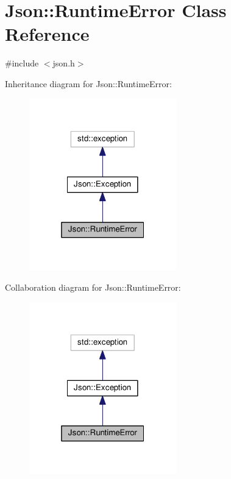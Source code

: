 \hypertarget{class_json_1_1_runtime_error}{}\section{Json\+:\+:Runtime\+Error Class Reference}
\label{class_json_1_1_runtime_error}


{\ttfamily \#include $<$json.\+h$>$}



Inheritance diagram for Json\+:\+:Runtime\+Error\+:
\nopagebreak
\begin{figure}[H]
\begin{center}
\leavevmode
\includegraphics[width=181pt]{class_json_1_1_runtime_error__inherit__graph}
\end{center}
\end{figure}


Collaboration diagram for Json\+:\+:Runtime\+Error\+:
\nopagebreak
\begin{figure}[H]
\begin{center}
\leavevmode
\includegraphics[width=181pt]{class_json_1_1_runtime_error__coll__graph}
\end{center}
\end{figure}
